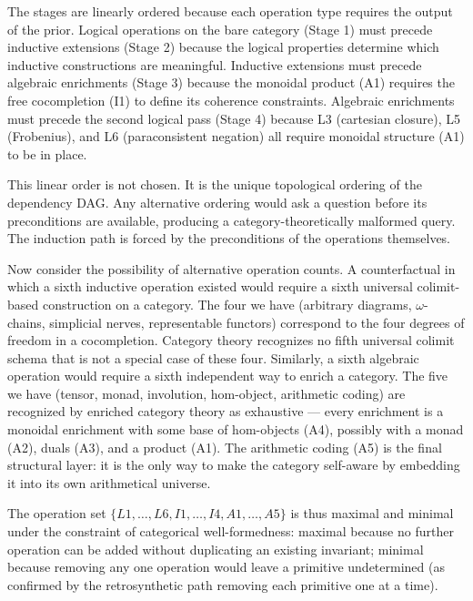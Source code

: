 \documentclass[12pt,a4paper]{article}
\begin{document}
The stages are linearly ordered because each operation type requires the output of the prior. Logical operations on the bare category (Stage 1) must precede inductive extensions (Stage 2) because the logical properties determine which inductive constructions are meaningful. Inductive extensions must precede algebraic enrichments (Stage 3) because the monoidal product (A1) requires the free cocompletion (I1) to define its coherence constraints. Algebraic enrichments must precede the second logical pass (Stage 4) because L3 (cartesian closure), L5 (Frobenius), and L6 (paraconsistent negation) all require monoidal structure (A1) to be in place.

This linear order is not chosen. It is the unique topological ordering of the dependency DAG. Any alternative ordering would ask a question before its preconditions are available, producing a category-theoretically malformed query. The induction path is forced by the preconditions of the operations themselves.

Now consider the possibility of alternative operation counts. A counterfactual in which a sixth inductive operation existed would require a sixth universal colimit-based construction on a category. The four we have (arbitrary diagrams, $\omega$-chains, simplicial nerves, representable functors) correspond to the four degrees of freedom in a cocompletion. Category theory recognizes no fifth universal colimit schema that is not a special case of these four. Similarly, a sixth algebraic operation would require a sixth independent way to enrich a category. The five we have (tensor, monad, involution, hom-object, arithmetic coding) are recognized by enriched category theory as exhaustive --- every enrichment is a monoidal enrichment with some base of hom-objects (A4), possibly with a monad (A2), duals (A3), and a product (A1). The arithmetic coding (A5) is the final structural layer: it is the only way to make the category self-aware by embedding it into its own arithmetical universe.

The operation set $\{L1,\dots,L6, I1,\dots,I4, A1,\dots,A5\}$ is thus maximal and minimal under the constraint of categorical well-formedness: maximal because no further operation can be added without duplicating an existing invariant; minimal because removing any one operation would leave a primitive undetermined (as confirmed by the retrosynthetic path removing each primitive one at a time).
\end{document}
